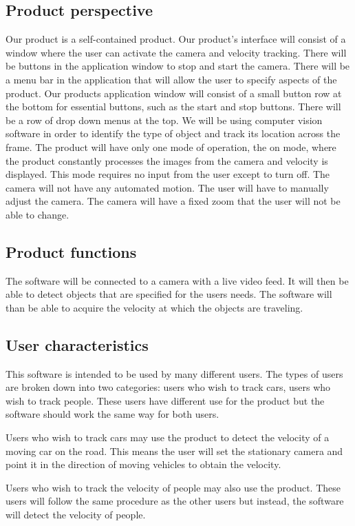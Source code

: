 \documentclass[letterpaper,10pt,onecolumn,draftclsnofoot]{IEEEtran}
\begin{document}
\subsection{Product perspective}
Our product is a self-contained product. 
Our product's interface will consist of a window where the user can activate the camera and velocity tracking.
There will be buttons in the application window to stop and start the camera. 
There will be a menu bar in the application that will allow the user to specify aspects of the product.
Our products application window will consist of a small button row at the bottom for essential buttons, such as the start and stop buttons.
There will be a row of drop down menus at the top.
We will be using computer vision software in order to identify the type of object and track its location across the frame.
The product will have only one mode of operation, the on mode, where the product constantly processes the images from the camera and velocity is displayed.
This mode requires no input from the user except to turn off.
The camera will not have any automated motion.
The user will have to manually adjust the camera.
The camera will have a fixed zoom that the user will not be able to change.

\subsection{Product functions}
The software will be connected to a camera with a live video feed.
It will then be able to detect objects that are specified for the users needs.
The software will than be able to acquire the velocity at which the objects are traveling.


\subsection{User characteristics}
This software is intended to be used by many different users.
The types of users are broken down into two categories: users who wish to track cars, users who wish to track people.
These users have different use for the product but the software should work the same way for both users.

Users who wish to track cars may use the product to detect the velocity of a moving car on the road.
This means the user will set the stationary camera and point it in the direction of moving vehicles to obtain the velocity.

Users who wish to track the velocity of people may also use the product.
These users will follow the same procedure as the other users but instead, the software will detect the velocity of people.
\end{document}
